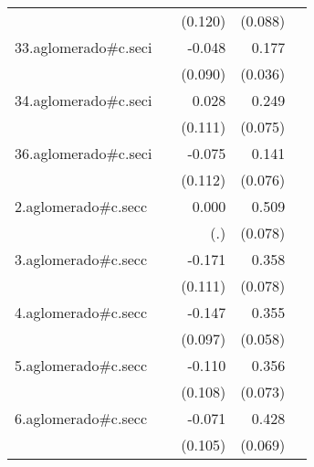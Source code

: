 {\begin{longtable}{l*{4}{D{.}{.}{-1}}}
            &                     &     (0.120)         &     (0.088)         &                     \\
\addlinespace
33.aglomerado#c.seci&                     &      -0.048         &       0.177\sym{***}&                     \\
            &                     &     (0.090)         &     (0.036)         &                     \\
\addlinespace
34.aglomerado#c.seci&                     &       0.028         &       0.249\sym{***}&                     \\
            &                     &     (0.111)         &     (0.075)         &                     \\
\addlinespace
36.aglomerado#c.seci&                     &      -0.075         &       0.141         &                     \\
            &                     &     (0.112)         &     (0.076)         &                     \\
\addlinespace
2.aglomerado#c.secc&                     &       0.000         &       0.509\sym{***}&                     \\
            &                     &         (.)         &     (0.078)         &                     \\
\addlinespace
3.aglomerado#c.secc&                     &      -0.171         &       0.358\sym{***}&                     \\
            &                     &     (0.111)         &     (0.078)         &                     \\
\addlinespace
4.aglomerado#c.secc&                     &      -0.147         &       0.355\sym{***}&                     \\
            &                     &     (0.097)         &     (0.058)         &                     \\
\addlinespace
5.aglomerado#c.secc&                     &      -0.110         &       0.356\sym{***}&                     \\
            &                     &     (0.108)         &     (0.073)         &                     \\
\addlinespace
6.aglomerado#c.secc&                     &      -0.071         &       0.428\sym{***}&                     \\
            &                     &     (0.105)         &     (0.069)         &                     \\

\end{longtable}}
